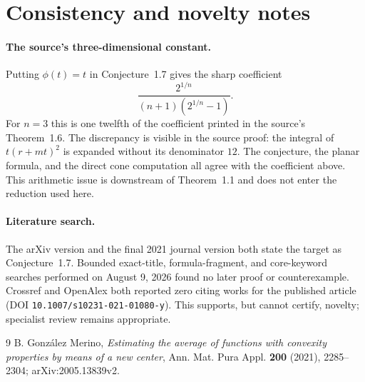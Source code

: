 \documentclass[11pt]{article}
\begin{document}
\section{Consistency and novelty notes}

\paragraph{The source's three-dimensional constant.}
Putting $\phi(t)=t$ in Conjecture~1.7 gives the sharp coefficient
\[
 \frac{2^{1/n}}{(n+1)(2^{1/n}-1)}.
\]
For $n=3$ this is one twelfth of the coefficient printed in the source's
Theorem~1.6.  The discrepancy is visible in the source proof: the integral
of $t(r+mt)^2$ is expanded without its denominator $12$.  The conjecture,
the planar formula, and the direct cone computation all agree with the
coefficient above.  This arithmetic issue is downstream of Theorem~1.1
and does not enter the reduction used here.

\paragraph{Literature search.}
The arXiv version and the final 2021 journal version both state the target
as Conjecture~1.7.  Bounded exact-title, formula-fragment, and core-keyword
searches performed on August 9, 2026 found no later proof or counterexample.
Crossref and OpenAlex both reported zero citing works for the published
article (DOI \texttt{10.1007/s10231-021-01080-y}).  This supports, but
cannot certify, novelty; specialist review remains appropriate.

\begin{thebibliography}{9}
B. González Merino,
\emph{Estimating the average of functions with convexity properties by
means of a new center},
Ann. Mat. Pura Appl. \textbf{200} (2021), 2285--2304;
arXiv:2005.13839v2.
\end{thebibliography}
\end{document}
